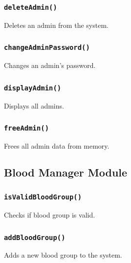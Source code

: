 \documentclass[12pt,a4paper]{report}
\begin{document}
\subsubsection{\texttt{deleteAdmin()}}
Deletes an admin from the system.


\subsubsection{\texttt{changeAdminPassword()}}
Changes an admin's password.


\subsubsection{\texttt{displayAdmin()}}
Displays all admins.


\subsubsection{\texttt{freeAdmin()}}
Frees all admin data from memory.


\subsection{Blood Manager Module}
\subsubsection{\texttt{isValidBloodGroup()}}
Checks if blood group is valid.


\subsubsection{\texttt{addBloodGroup()}}
Adds a new blood group to the system.

\end{document}
